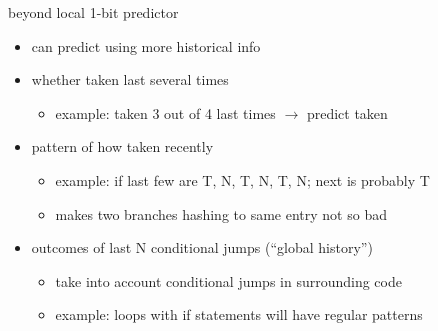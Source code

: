 \begin{frame}{beyond local 1-bit predictor}
    \begin{itemize}
        \item can predict using more historical info
        \vspace{.5cm}
        \item whether taken last several times
            \begin{itemize}
            \item example: taken 3 out of 4 last times $\rightarrow$ predict taken
            \end{itemize}
        \item pattern of how taken recently
            \begin{itemize}
            \item example: if last few are T, N, T, N, T, N; next is probably T
            \item makes two branches hashing to same entry not so bad
            \end{itemize}
        \item outcomes of last N conditional jumps (``global history'')
            \begin{itemize}
            \item take into account conditional jumps in surrounding code
            \item example: loops with if statements will have regular patterns
            \end{itemize}
    \end{itemize}
\end{frame}
